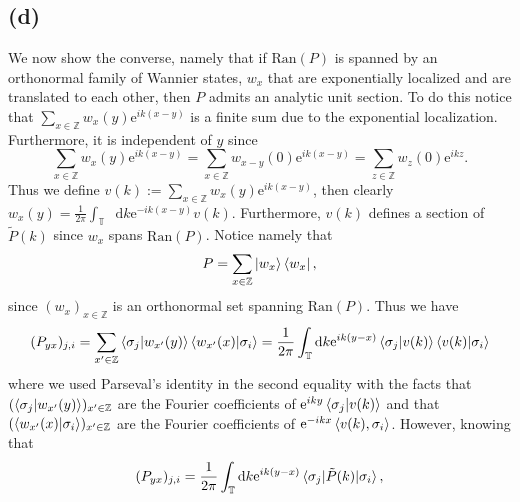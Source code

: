 \documentclass[a4paper,11pt]{article}
\newcommand{\euler}[1]{\text{e}^{#1}}
\newcommand{\Ran}[1]{\text{Ran}\left(#1\right)}
\newcommand*\diff{\mathop{}\!\mathrm{d}}
\newcommand{\Z}{\mathbb{Z}}
\numberwithin{equation}{section}
\begin{document}
 	 \subsection*{(d)}
 	 We now show the converse, namely that if $ \Ran{P} $ is spanned by an orthonormal family of Wannier states, $ w_x $ that are exponentially localized and are translated to each other, then $ P $ admits an analytic unit section.
 	 To do this notice that $ \sum_{x\in\Z} w_x(y)\euler{ik(x-y)} $ is a finite sum due to the exponential localization. Furthermore, it is independent of $ y $ since \begin{equation}
 	 \sum_{x\in\Z} w_x(y)\euler{ik(x-y)}=\sum_{x\in\Z} w_{x-y}(0)\euler{ik(x-y)}=\sum_{z\in\Z} w_z(0)\euler{ikz}.
 	 \end{equation}
	 Thus we define $ v(k):=\sum_{x\in\Z} w_x(y)\euler{ik(x-y)} $, then clearly $ w_x(y)=\frac{1}{2\pi}\int_{\mathbb{T}}\diff k\euler{-ik(x-y)}v(k) $. Furthermore, $ v(k) $ defines a section of $ \tilde{P}(k) $ since $ w_x$ spans $\Ran{P} $. Notice namely that \begin{equation}
	 P=\sum_{x\in\Z}\ket{w_x}\bra{w_x},
	 \end{equation}
	 since $ (w_x)_{x\in \Z} $ is an orthonormal set spanning $ \Ran{P} $. Thus we have
 	 \begin{equation}
 	 \begin{aligned}
 	 (P_{yx})_{j,i}=\sum_{x'\in\Z}\braket{\sigma_j|w_{x'}(y)}\braket{w_{x'}(x)|\sigma_i}=\frac{1}{2\pi}\int_{\mathbb{T}}\diff k\euler{ik(y-x)}\braket{\sigma_j|v(k)}\braket{v(k)|\sigma_i}
 	 \end{aligned}
 	 \end{equation}
 	 where we used Parseval's identity in the second equality with the facts that $ (\braket{\sigma_j|w_{x'}(y)})_{x'\in\Z} $ are the Fourier coefficients of $ \euler{iky}\braket{\sigma_j|v(k)} $ and that $ (\braket{w_{x'}(x)|\sigma_i})_{x'\in\Z} $ are the Fourier coefficients of $ \euler{-ikx}\braket{v(k),\sigma_i} $. However, knowing that \begin{equation}
 	 (P_{yx})_{j,i}=\frac{1}{2\pi}\int_{\mathbb{T}}\diff k\euler{ik(y-x)}\braket{\sigma_j|\tilde{P}(k)|\sigma_i},
 	 \end{equation}
\end{document}
